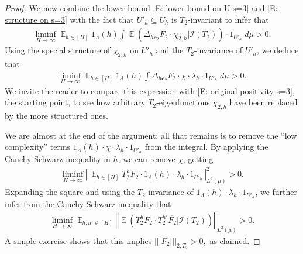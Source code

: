 \documentclass[11pt]{amsart}
\theoremstyle{definition}
\DeclareMathOperator*{\E}{\mathbb{E}}
\newcommand{\CI}{{\mathcal I}}
\newcommand{\be}{{\mathbf{e}}}
\newcommand{\norm}[1]{\left\Vert #1\right\Vert}
\newcommand{\nnorm}[1]{\lvert\!|\!| #1|\!|\!\rvert}
\newcommand{\1}{{\mathbf{1}}}
\begin{document}
\begin{proof}
We now combine the lower bound \eqref{E: lower bound on U s=3} and \eqref{E: structure on s=3} with the fact that $U'_h\subseteq U_h$ is $T_2$-invariant to infer that
    \begin{align*}
         \liminf_{H\to\infty} \E_{h\in[H]}1_{\Lambda}(h)\int \E(\Delta_{h\be_2} F_2\cdot {\chi_{2,h}}|\CI(T_2))\cdot 1_{U'_h}\; d\mu > 0.
    \end{align*}
    Using the special structure of  $\chi_{2,h}$ on $U'_h$ and the $T_2$-invariance of $U'_h$, we deduce that
    \begin{align}\label{E: plugging special structure}
                 \liminf_{H\to\infty} \E_{h\in[H]}1_{\Lambda}(h)\int \Delta_{h\be_2} F_2\cdot \chi\cdot \lambda_h\cdot 1_{U'_h}\; d\mu > 0.
    \end{align}
    We invite the reader to compare this expression with \eqref{E: original positivity s=3}, the starting point, to see how arbitrary $T_2$-eigenfunctions $\chi_{2,h}$ have been replaced by the more structured ones. 

    We are almost at the end of the argument; all that remains is to remove the ``low complexity'' terms $1_{\Lambda}(h)\cdot \chi\cdot \lambda_h\cdot 1_{U'_h}$ from the integral. By applying the Cauchy-Schwarz inequality in $h$, we can remove $\chi$, getting
    \begin{align*}
        \liminf_{H\to\infty} \norm{\E_{h\in[H]}T_2^h \overline{F_2}\cdot 1_{\Lambda}(h)\cdot \lambda_h\cdot 1_{U'_h}}_{L^2(\mu)}^2 > 0.
    \end{align*}
    Expanding the square and using the $T_2$-invariance of $1_{\Lambda}(h)\cdot\lambda_h\cdot 1_{U'_h}$, we further infer from the Cauchy-Schwarz inequality that
    \begin{align*}
        \liminf_{H\to\infty} \E_{h,h'\in[H]}\norm{\E(T_2^h F_2\cdot T_2^{h'}\overline{F_2}|\CI(T_2))}_{L^2(\mu)}>0.
    \end{align*}
    A simple exercise shows that this implies $\nnorm{F_2}_{2, T_2}>0,$ as claimed.
    

\end{proof}
\end{document}
